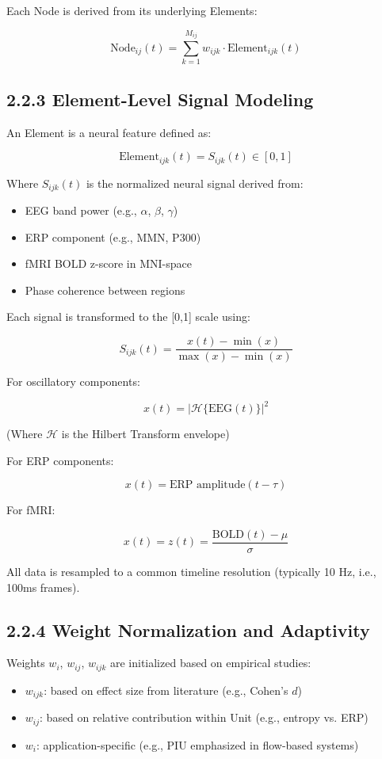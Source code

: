 Each Node is derived from its underlying Elements:

\[
\text{Node}_{ij}(t) = \sum_{k=1}^{M_{ij}} w_{ijk} \cdot \text{Element}_{ijk}(t)
\]

\subsection*{2.2.3 Element-Level Signal Modeling}

An Element is a neural feature defined as:

\[
\text{Element}_{ijk}(t) = S_{ijk}(t) \in [0,1]
\]

Where $S_{ijk}(t)$ is the normalized neural signal derived from:

\begin{itemize}
    \item EEG band power (e.g., $\alpha$, $\beta$, $\gamma$)
    \item ERP component (e.g., MMN, P300)
    \item fMRI BOLD z-score in MNI-space
    \item Phase coherence between regions
\end{itemize}

Each signal is transformed to the [0,1] scale using:

\[
S_{ijk}(t) = \frac{x(t) - \min(x)}{\max(x) - \min(x)}
\]

For oscillatory components:

\[
x(t) = \left| \mathcal{H}\{ \text{EEG}(t) \} \right|^2
\]

(Where $\mathcal{H}$ is the Hilbert Transform envelope)

For ERP components:

\[
x(t) = \text{ERP amplitude}(t - \tau)
\]

For fMRI:

\[
x(t) = z(t) = \frac{\text{BOLD}(t) - \mu}{\sigma}
\]

All data is resampled to a common timeline resolution (typically 10 Hz, i.e., 100ms frames).

\subsection*{2.2.4 Weight Normalization and Adaptivity}

Weights $w_i$, $w_{ij}$, $w_{ijk}$ are initialized based on empirical studies:

\begin{itemize}
    \item $w_{ijk}$: based on effect size from literature (e.g., Cohen’s $d$)
    \item $w_{ij}$: based on relative contribution within Unit (e.g., entropy vs. ERP)
    \item $w_i$: application-specific (e.g., PIU emphasized in flow-based systems)
\end{itemize}

